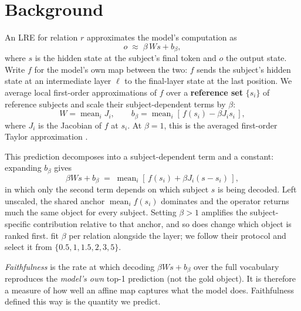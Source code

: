 \documentclass{article}
\begin{document}
\section{Background}
\label{sec:background}

An LRE for relation $r$ approximates the model's computation as
\begin{equation}
  o \;\approx\; \beta\, W s + b_\beta ,
  \label{eq:basiclre}
\end{equation}
where $s$ is the hidden state at the subject's final token and $o$ the
output state. Write $f$ for the model's own map between the two: $f$
sends the subject's hidden state at an intermediate layer $\ell$ to the
final-layer state at the last position. We average local
first-order approximations of $f$ over a \textbf{reference set} $\{s_i\}$ of reference
subjects and scale their subject-dependent terms by $\beta$:
\begin{equation}
W = \operatorname{mean}_i J_i , \qquad
b_\beta = \operatorname{mean}_i\!\left[\, f(s_i) - \beta J_i s_i \,\right] ,
\label{eq:wb}
\end{equation}
where $J_i$ is the Jacobian of $f$ at $s_i$. At $\beta=1$, this is the
averaged first-order Taylor approximation
\citep{hernandez2024linearity}.

This prediction decomposes into a subject-dependent term
and a constant: expanding $b_\beta$ gives
\begin{equation}
\beta W s + b_\beta \;=\;
\operatorname{mean}_i\!\left[\,f(s_i) + \beta J_i (s -
  s_i)\,\right],
\label{eq:beta}
\end{equation}
in which only the second term depends on which subject $s$ is being decoded.
Left unscaled, the shared anchor $\operatorname{mean}_i f(s_i)$ dominates
and the operator returns much the same object for every subject.
Setting $\beta > 1$ amplifies the subject-specific contribution relative
to that anchor, and so does change which object is ranked first.
\citet{hernandez2024linearity} fit $\beta$ per relation alongside the
layer; we follow their protocol and select it from
$\{0.5, 1, 1.5, 2, 3, 5\}$.




\emph{Faithfulness} is the rate at which
decoding $\beta W s + b_\beta$ over the full vocabulary reproduces the
\emph{model's own} top-1 prediction (not the gold object). It is therefore
a measure of how well an affine map captures what the model
does. Faithfulness defined this way is
the quantity we predict.


\end{document}
